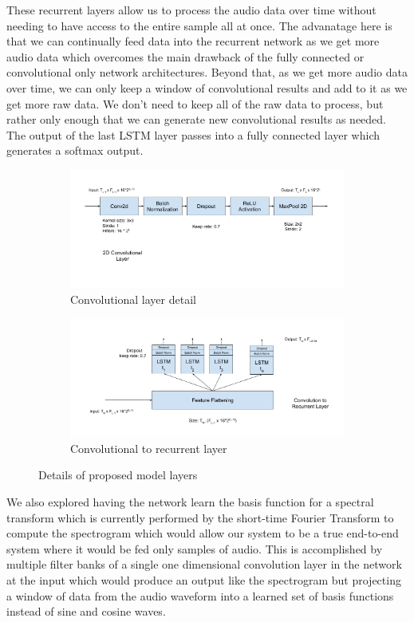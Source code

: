 \documentclass{article}
\begin{document}
These recurrent layers allow us to process
the audio data over time without needing to have access to the entire
sample all at once. The advanatage here is that we can continually feed
data into the recurrent network as we get more audio data which
overcomes the main drawback of the fully connected or convolutional
only network architectures. Beyond that, as we get more audio data
over time, we can only keep a window of convolutional results and add
to it as we get more raw data. We don't need to keep all of the raw
data to process, but rather only enough that we can generate new
convolutional results as needed. The output of the last LSTM layer
passes into a fully connected layer which generates a softmax output.
\begin{figure}
  \begin{subfigure}{.5\linewidth}
    \includegraphics[width=\linewidth]{images/crnn-conv_layer}
    \caption{Convolutional layer detail}
    \label{fig:crnn-conv}
  \end{subfigure}%
  \begin{subfigure}{.5\linewidth}
    \includegraphics[width=\linewidth]{images/crnn-lstm_layer}
    \caption{Convolutional to recurrent layer}
    \label{fig:crnn-lstm}
  \end{subfigure}
  \caption{Details of proposed model layers}
\end{figure}
We also explored having the network learn the basis function for a
spectral transform which is currently performed by the short-time
Fourier Transform to compute the spectrogram which would allow our
system to be a true end-to-end system where it would be fed only
samples of audio. This is accomplished by multiple filter banks of a
single one dimensional convolution
layer in the network at the input which would produce an output like the
spectrogram but projecting a window of data from the audio waveform
into a learned set of basis functions instead of sine and cosine waves.
\end{document}
